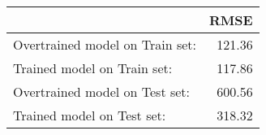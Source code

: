 \begin{tabular}{lr}
\toprule
{} & RMSE\\
\midrule
Overtrained model on Train set: & 121.36 \\
Trained model on Train set: & 117.86 \\
Overtrained model on Test set: & 600.56 \\
Trained model on Test set:  & 318.32 \\

\bottomrule
\end{tabular}

